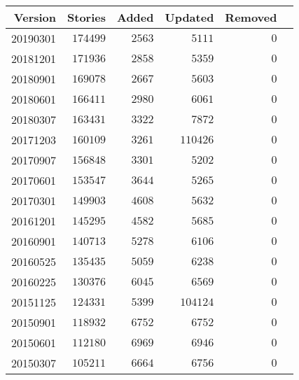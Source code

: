 \documentclass[hidelinks,a4paper,12pt]{article}
\begin{document}
\begin{center}
\begin{tabular}{|r|r|r|r|r|r|} \hline
\textbf{Version} & \textbf{Stories} & \textbf{Added} & \textbf{Updated} & \textbf{Removed} \\ \hline
20190301         & $174499$         & $2563$         & $5111$           & $0$              \\ \hline
20181201         & $171936$         & $2858$         & $5359$           & $0$              \\ \hline
20180901         & $169078$         & $2667$         & $5603$           & $0$              \\ \hline
20180601         & $166411$         & $2980$         & $6061$           & $0$              \\ \hline
20180307         & $163431$         & $3322$         & $7872$           & $0$              \\ \hline
20171203         & $160109$         & $3261$         & $110426$         & $0$              \\ \hline
20170907         & $156848$         & $3301$         & $5202$           & $0$              \\ \hline
20170601         & $153547$         & $3644$         & $5265$           & $0$              \\ \hline
20170301         & $149903$         & $4608$         & $5632$           & $0$              \\ \hline
20161201         & $145295$         & $4582$         & $5685$           & $0$              \\ \hline
20160901         & $140713$         & $5278$         & $6106$           & $0$              \\ \hline
20160525         & $135435$         & $5059$         & $6238$           & $0$              \\ \hline
20160225         & $130376$         & $6045$         & $6569$           & $0$              \\ \hline
20151125         & $124331$         & $5399$         & $104124$         & $0$              \\ \hline
20150901         & $118932$         & $6752$         & $6752$           & $0$              \\ \hline
20150601         & $112180$         & $6969$         & $6946$           & $0$              \\ \hline
20150307         & $105211$         & $6664$         & $6756$           & $0$              \\ \hline

\end{tabular}
\end{center}
\end{document}
